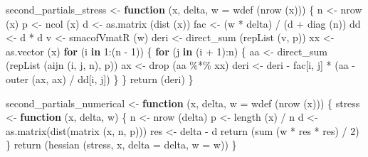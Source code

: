 \documentclass[
  12pt,
  letterpaper,
  DIV=11,
  numbers=noendperiod]{scrreprt}
\newenvironment{Shaded}{\begin{snugshade}}{\end{snugshade}}
\newcommand{\AttributeTok}[1]{\textcolor[rgb]{0.40,0.45,0.13}{#1}}
\newcommand{\ControlFlowTok}[1]{\textcolor[rgb]{0.00,0.23,0.31}{\textbf{#1}}}
\newcommand{\DecValTok}[1]{\textcolor[rgb]{0.68,0.00,0.00}{#1}}
\newcommand{\FunctionTok}[1]{\textcolor[rgb]{0.28,0.35,0.67}{#1}}
\newcommand{\NormalTok}[1]{\textcolor[rgb]{0.00,0.23,0.31}{#1}}
\newcommand{\OtherTok}[1]{\textcolor[rgb]{0.00,0.23,0.31}{#1}}
\newcommand{\SpecialCharTok}[1]{\textcolor[rgb]{0.37,0.37,0.37}{#1}}
\theoremstyle{remark}
\begin{document}
\begin{Shaded}
\begin{Highlighting}[]
\NormalTok{second\_partials\_stress }\OtherTok{\textless{}{-}}
  \ControlFlowTok{function}\NormalTok{ (x, delta, }\AttributeTok{w =} \FunctionTok{wdef}\NormalTok{ (}\FunctionTok{nrow}\NormalTok{ (x))) \{}
\NormalTok{    n }\OtherTok{\textless{}{-}} \FunctionTok{nrow}\NormalTok{ (x)}
\NormalTok{    p }\OtherTok{\textless{}{-}} \FunctionTok{ncol}\NormalTok{ (x)}
\NormalTok{    d }\OtherTok{\textless{}{-}} \FunctionTok{as.matrix}\NormalTok{ (}\FunctionTok{dist}\NormalTok{ (x))}
\NormalTok{    fac }\OtherTok{\textless{}{-}}\NormalTok{ (w }\SpecialCharTok{*}\NormalTok{ delta) }\SpecialCharTok{/}\NormalTok{ (d }\SpecialCharTok{+} \FunctionTok{diag}\NormalTok{ (n))}
\NormalTok{    dd }\OtherTok{\textless{}{-}}\NormalTok{ d }\SpecialCharTok{*}\NormalTok{ d}
\NormalTok{    v }\OtherTok{\textless{}{-}} \FunctionTok{smacofVmatR}\NormalTok{ (w)}
\NormalTok{    deri }\OtherTok{\textless{}{-}} \FunctionTok{direct\_sum}\NormalTok{ (}\FunctionTok{repList}\NormalTok{ (v, p))}
\NormalTok{    xx }\OtherTok{\textless{}{-}} \FunctionTok{as.vector}\NormalTok{ (x)}
    \ControlFlowTok{for}\NormalTok{ (i }\ControlFlowTok{in} \DecValTok{1}\SpecialCharTok{:}\NormalTok{(n }\SpecialCharTok{{-}} \DecValTok{1}\NormalTok{)) \{}
      \ControlFlowTok{for}\NormalTok{ (j }\ControlFlowTok{in}\NormalTok{ (i }\SpecialCharTok{+} \DecValTok{1}\NormalTok{)}\SpecialCharTok{:}\NormalTok{n) \{}
\NormalTok{        aa }\OtherTok{\textless{}{-}} \FunctionTok{direct\_sum}\NormalTok{ (}\FunctionTok{repList}\NormalTok{ (}\FunctionTok{aijn}\NormalTok{ (i, j, n), p))}
\NormalTok{        ax }\OtherTok{\textless{}{-}} \FunctionTok{drop}\NormalTok{ (aa }\SpecialCharTok{\%*\%}\NormalTok{ xx)}
\NormalTok{        deri }\OtherTok{\textless{}{-}}\NormalTok{ deri }\SpecialCharTok{{-}}\NormalTok{ fac[i, j] }\SpecialCharTok{*}\NormalTok{ (aa }\SpecialCharTok{{-}} \FunctionTok{outer}\NormalTok{ (ax, ax) }\SpecialCharTok{/}\NormalTok{ dd[i, j])}
\NormalTok{      \}}
\NormalTok{    \}}
    \FunctionTok{return}\NormalTok{ (deri)}
\NormalTok{  \}}

\NormalTok{second\_partials\_numerical }\OtherTok{\textless{}{-}}
  \ControlFlowTok{function}\NormalTok{ (x, delta, }\AttributeTok{w =} \FunctionTok{wdef}\NormalTok{ (}\FunctionTok{nrow}\NormalTok{ (x))) \{}
\NormalTok{    stress }\OtherTok{\textless{}{-}} \ControlFlowTok{function}\NormalTok{ (x, delta, w) \{}
\NormalTok{      n }\OtherTok{\textless{}{-}} \FunctionTok{nrow}\NormalTok{ (delta)}
\NormalTok{      p }\OtherTok{\textless{}{-}} \FunctionTok{length}\NormalTok{ (x) }\SpecialCharTok{/}\NormalTok{ n}
\NormalTok{      d }\OtherTok{\textless{}{-}} \FunctionTok{as.matrix}\NormalTok{(}\FunctionTok{dist}\NormalTok{(}\FunctionTok{matrix}\NormalTok{ (x, n, p)))}
\NormalTok{      res }\OtherTok{\textless{}{-}}\NormalTok{ delta }\SpecialCharTok{{-}}\NormalTok{ d}
      \FunctionTok{return}\NormalTok{ (}\FunctionTok{sum}\NormalTok{ (w }\SpecialCharTok{*}\NormalTok{ res }\SpecialCharTok{*}\NormalTok{ res) }\SpecialCharTok{/} \DecValTok{2}\NormalTok{)}
\NormalTok{    \}}
    \FunctionTok{return}\NormalTok{ (}\FunctionTok{hessian}\NormalTok{ (stress, x, }\AttributeTok{delta =}\NormalTok{ delta, }\AttributeTok{w =}\NormalTok{ w))}
\NormalTok{  \}}


\end{Highlighting}
\end{Shaded}
\end{document}
